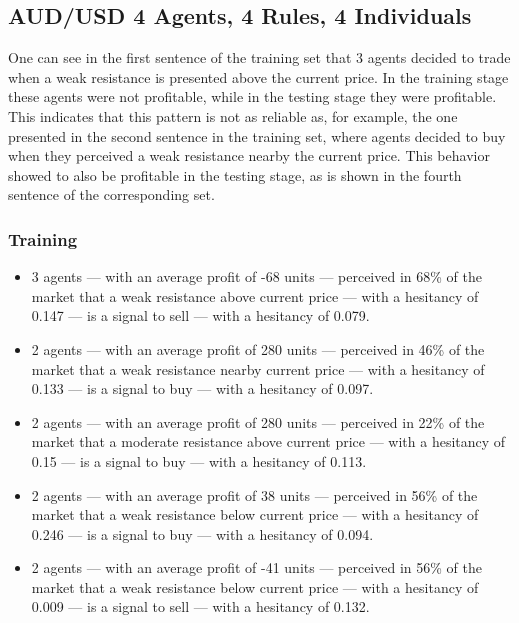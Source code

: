 
\subsection{AUD/USD 4 Agents, 4 Rules, 4 Individuals}
\label{}

One can see in the first sentence of the training set that 3 agents decided to
trade when a weak resistance is presented above the current price. In the
training stage these agents were not profitable, while in the testing stage they
were profitable. This indicates that this pattern is not as reliable as, for
example, the one presented in the second sentence in the training set, where
agents decided to buy when they perceived a weak resistance nearby the current
price. This behavior showed to also be profitable in the testing stage, as is
shown in the fourth sentence of the corresponding set.

\subsubsection{Training}
\label{}

{\small
  \begin{itemize}
  \item 3 agents — with an average profit of -68 units — perceived in 68\% of
    the market that a weak resistance above current price — with a hesitancy of
    0.147 — is a signal to sell — with a hesitancy of 0.079.
  \item 2 agents — with an average profit of 280 units — perceived in 46\% of
    the market that a weak resistance nearby current price — with a hesitancy of
    0.133 — is a signal to buy — with a hesitancy of 0.097.
  \item 2 agents — with an average profit of 280 units — perceived in 22\% of
    the market that a moderate resistance above current price — with a hesitancy
    of 0.15 — is a signal to buy — with a hesitancy of 0.113.
  \item 2 agents — with an average profit of 38 units — perceived in 56\% of the
    market that a weak resistance below current price — with a hesitancy of
    0.246 — is a signal to buy — with a hesitancy of 0.094.
  \item 2 agents — with an average profit of -41 units — perceived in 56\% of
    the market that a weak resistance below current price — with a hesitancy of
    0.009 — is a signal to sell — with a hesitancy of 0.132.
  \end{itemize}
}

